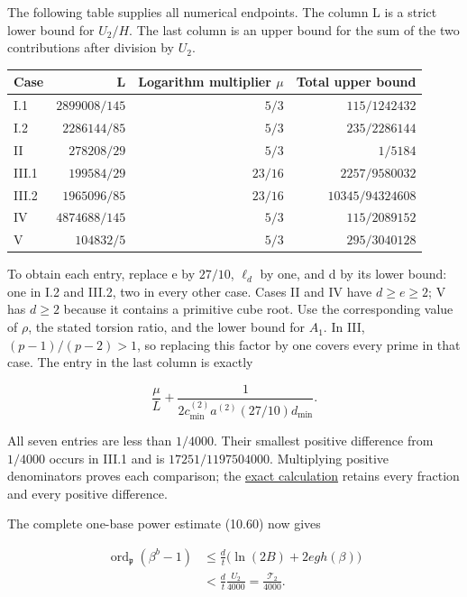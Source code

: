 \documentclass[
  11pt,
  a4paper,
]{article}
\newcounter{none} %
\begin{document}
The following table supplies all numerical endpoints. The column L is a
strict lower bound for \(U_2/H\). The last column is an upper bound for
the sum of the two contributions after division by \(U_2\).

{\def\LTcaptype{none} %
\begin{longtable}[]{@{}lrrr@{}}
\toprule\noalign{}
Case & L & Logarithm multiplier \(\mu\) & Total upper bound \\
\midrule\noalign{}
\endhead
\bottomrule\noalign{}
\endlastfoot
I.1 & \(2899008/145\) & \(5/3\) & \(115/1242432\) \\
I.2 & \(2286144/85\) & \(5/3\) & \(235/2286144\) \\
II & \(278208/29\) & \(5/3\) & \(1/5184\) \\
III.1 & \(199584/29\) & \(23/16\) & \(2257/9580032\) \\
III.2 & \(1965096/85\) & \(23/16\) & \(10345/94324608\) \\
IV & \(4874688/145\) & \(5/3\) & \(115/2089152\) \\
V & \(104832/5\) & \(5/3\) & \(295/3040128\) \\
\end{longtable}
}

To obtain each entry, replace \(\mathrm e\) by \(27/10\), \(\ell_d\) by
one, and d by its lower bound: one in I.2 and III.2, two in every other
case. Cases II and IV have \(d\ge e\ge2\); V has \(d\ge2\) because it
contains a primitive cube root. Use the corresponding value of \(\rho\),
the stated torsion ratio, and the lower bound for \(A_1\). In III,
\((p-1)/(p-2)>1\), so replacing this factor by one covers every prime in
that case. The entry in the last column is exactly

\[
\frac\mu L+
\frac1{2c_{\min}^{(2)}a^{(2)}(27/10)d_{\min}}.
\tag{10.523}
\]

All seven entries are less than \(1/4000\). Their smallest positive
difference from \(1/4000\) occurs in III.1 and is \(17251/1197504000\).
Multiplying positive denominators proves each comparison; the
\href{../figure_sources/yu_second_singleton_budget.py}{exact
calculation} retains every fraction and every positive difference.

The complete one-base power estimate (10.60) now gives

\[
\begin{aligned}
\operatorname{ord}_{\mathfrak p}(\beta^b-1)
&\le\frac d t\bigl(\ln(2B)+2eg h(\beta)\bigr)\\
&<\frac d t\frac{U_2}{4000}
=\frac{\mathcal T_2}{4000}.
\end{aligned}
\tag{10.524}
\]
\end{document}
